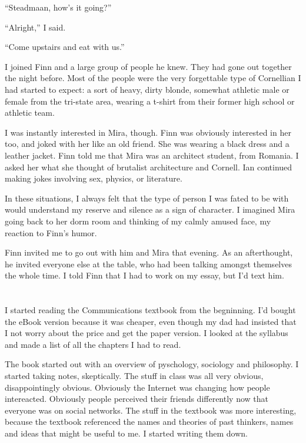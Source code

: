 ``Steadmaan, how's it going?''

``Alright,'' I said.

``Come upstairs and eat with us.'' 

I joined Finn and a large group of people he knew.  They had gone out together
the night before.  Most of the people were the very forgettable type of
Cornellian I had started to expect: a sort of heavy, dirty blonde, somewhat
athletic male or female from the tri-state area, wearing a t-shirt from their
former high school or athletic team.

I was instantly interested in Mira, though.  Finn was obviously interested in
her too, and joked with her like an old friend.  She was wearing a black dress
and a leather jacket.  Finn told me that Mira was an architect student, from
Romania.  I asked her what she thought of brutalist architecture and Cornell.
Ian continued making jokes involving sex, physics, or literature. 

In these situations, I always felt that the type of person I was fated to be
with would understand my reserve and silence as a sign of character.  I imagined
Mira going back to her dorm room and thinking of my calmly amused face, my
reaction to Finn's humor.  

Finn invited me to go out with him and Mira that evening.  As an afterthought,
he invited everyone else at the table, who had been talking amongst themselves
the whole time.  I told Finn that I had to work on my essay, but I'd text him.

\section{}

I started reading the Communications textbook from the begninning.  I'd bought
the eBook version because it was cheaper, even though my dad had insisted that I
not worry about the price and get the paper version.  I looked at the syllabus
and made a list of all the chapters I had to read.  

The book started out with an overview of pyschology, sociology and philosophy.
I started taking notes, skeptically.  The stuff in class was all very obvious,
disappointingly obvious.  Obviously the Internet was changing how people
intereacted.  Obviously people perceived their friends differently now that
everyone was on social networks.  The stuff in the textbook was more
interesting, because the textbook referenced the names and theories of past
thinkers, names and ideas that might be useful to me.  I started writing them
down. 

